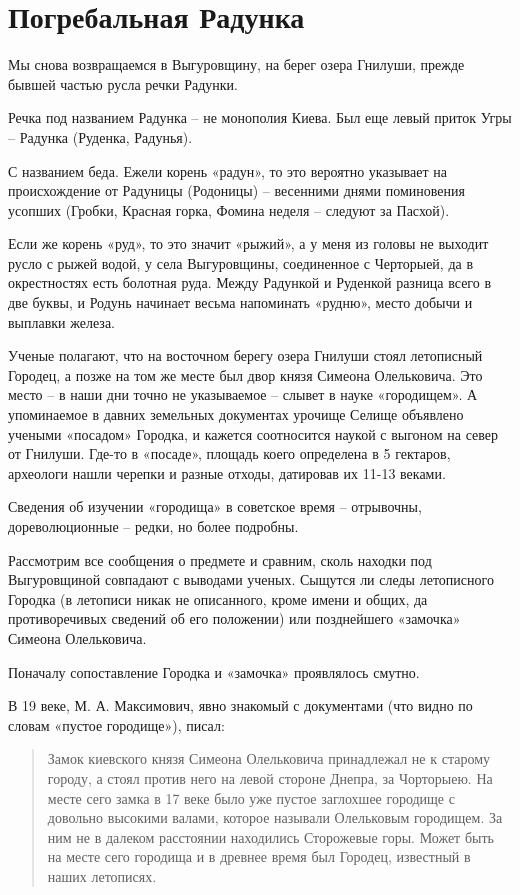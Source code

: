 \chapter{Погребальная Радунка}

Мы снова возвращаемся в Выгуровщину, на берег озера Гнилуши, прежде бывшей частью русла речки Радунки.

Речка под названием Радунка – не монополия Киева. Был еще левый приток Угры – Радунка (Руденка, Радунья).

С названием беда. Ежели корень «радун», то это вероятно указывает на происхождение от Радуницы (Родоницы) – весенними днями поминовения усопших (Гробки, Красная горка, Фомина неделя – следуют за Пасхой).

Если же корень «руд», то это значит «рыжий», а у меня из головы не выходит русло с рыжей водой, у села Выгуровщины, соединенное с Черторыей, да в окрестностях есть болотная руда. Между Радункой и Руденкой разница всего в две буквы, и Родунь начинает весьма напоминать «рудню», место добычи и выплавки железа.

Ученые полагают, что на восточном берегу озера Гнилуши стоял летописный Городец, а позже на том же месте был двор князя Симеона Олельковича. Это место – в наши дни точно не указываемое – слывет в науке «городищем». А упоминаемое в давних земельных документах урочище Селище объявлено учеными «посадом» Городка, и кажется соотносится наукой с выгоном на север от Гнилуши. Где-то в «посаде», площадь коего определена в 5 гектаров, археологи нашли черепки и разные отходы, датировав их 11-13 веками.

Сведения об изучении «городища» в советское время – отрывочны, дореволюционные – редки, но более подробны.

Рассмотрим все сообщения о предмете и сравним, сколь находки под Выгуровщиной совпадают с выводами ученых. Сыщутся ли следы летописного Городка (в летописи никак не описанного, кроме имени и общих, да противоречивых сведений об его положении) или позднейшего «замочка» Симеона Олельковича.

Поначалу сопоставление Городка и «замочка» проявлялось смутно.

В 19 веке, М. А. Максимович, явно знакомый с документами (что видно по словам «пустое городище»), писал:

\begin{quotation}
Замок киевского князя Симеона Олельковича принадлежал не к старому городу, а стоял против него на левой стороне Днепра, за Чорторыею. На месте сего замка в 17 веке было уже пустое заглохшее городище с довольно высокими валами, которое называли Олельковым городищем. За ним не в далеком расстоянии находились Сторожевые горы. Может быть на месте сего городища и в древнее время был Городец, известный в наших летописях.
\end{quotation}

